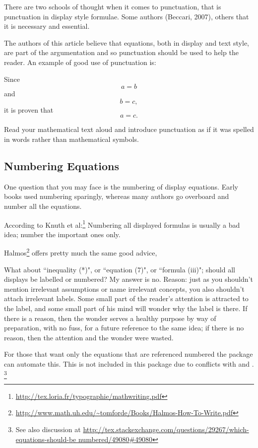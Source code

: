 {There are two schools of thought when it comes to punctuation, that is punctuation in display style formulae. Some authors (Beccari, 2007), others that it is necessary and essential.

The authors of this article believe that equations, both in display and text style, are part of the argumentation
and so punctuation should be used to help
the reader. An example of good use of punctuation is:


Since
\[ a=b \]
and
\[b=c,\]
it is proven that
\[a =c. \]

Read your mathematical text aloud and introduce punctuation as if it was spelled in words rather than mathematical symbols. 

\subsection{Numbering Equations}

One question that you may face is the numbering of display equations. Early books used numbering sparingly, whereas many authors go overboard and number all the equations.

According to Knuth et al:\footnote{\url{http://tex.loria.fr/typographie/mathwriting.pdf}}
Numbering all displayed formulas is usually a bad idea; number the important ones only.

Halmos\footnote{\url{http://www.math.uh.edu/~tomforde/Books/Halmos-How-To-Write.pdf}} offers pretty much the same good advice,

\begin{latexquotation}
What about ``inequality (*)", or ``equation (7)", or ``formula (iii)"; should all displays be labelled or numbered? My answer is no. Reason: just as you shouldn't mention irrelevant assumptions or name irrelevant concepts, you also shouldn't attach irrelevant labels. Some small part of the reader's attention is attracted to the label, and some small part of his mind will wonder why the label is there. If there is a reason, then the wonder serves a healthy purpose by way of preparation, with no fuss, for a future reference to the same idea; if there is no reason, then the attention and the wonder were wasted.
\end{latexquotation}

For those that want only the equations that are referenced numbered the package  can automate this. This is not included in this package due to conflicts with  and .
\footnote{See also discussion at \protect\url{http://tex.stackexchange.com/questions/29267/which-equations-should-be numbered/49080\#49080}}

}
